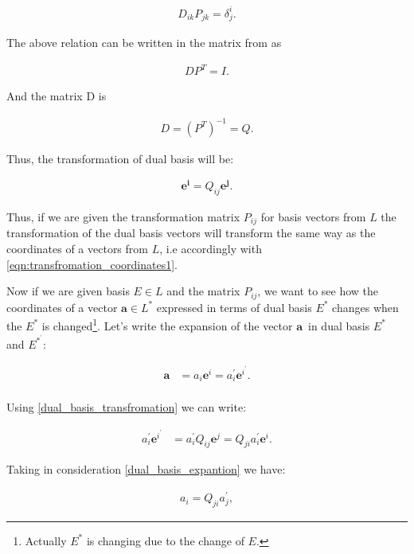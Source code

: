 \documentclass{book}
\begin{document}
\begin{align}
 D_{ik}P_{jk} = \delta^{i}_j.
\end{align}

The above relation can be written in the matrix from as

\begin{align}
 DP^{T} = I.
\end{align}

And the matrix D is

\begin{align}
 D = (P^T)^{-1} = Q.
\end{align}

Thus, the transformation of dual basis will be:

\begin{align}
\boldsymbol{e^i} = Q_{ij}\boldsymbol{e^{j}}. \label{dual_basis_transfromation}
\end{align}

Thus, if we are given the transformation matrix $P_{ij}$ for basis vectors from $L$ the transformation of the dual basis vectors will transform the same way as the coordinates of a vectors from $L$, i.e accordingly with \eqref{eqn:transfromation_coordinates1}.

Now if we are given basis $E \in L$ and the matrix $P_{ij}$, we want to see how the coordinates of a vector $\boldsymbol{a} \in L^{*}$ expressed in terms of dual basis $E^*$ changes when the $E^*$ is changed\footnote{Actually $E^*$ is changing due to the change of $E$.}. Let's write the expansion of the vector $\boldsymbol{a}$\ in dual basis $E^*$ and $E^{*}^{'}$:

\begin{align*}
\boldsymbol{a} &= a_{i}\boldsymbol{e}^{i} = a_{i}^{'}\boldsymbol{e}^{i}^{'}. \label{dual_basis_expantion} \\
\end{align*}

Using \eqref{dual_basis_transfromation} we can write:

\begin{align*}
a_{i}^{'}\boldsymbol{e}^{i}^{'} &= a_{i}^{'}Q_{ij}\boldsymbol{e}^{j} = Q_{ji} a_{i}^{'}\boldsymbol{e}^{i}.
\end{align*}

Taking in consideration \eqref{dual_basis_expantion} we have:

\begin{align*}
a_{i} = Q_{ji}a_{j}^{'},
\end{align*}
\end{document}

